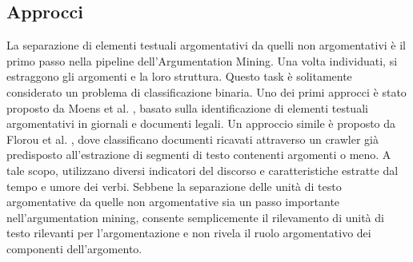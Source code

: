 \subsection{Approcci}
La separazione di elementi testuali argomentativi da quelli non argomentativi è il primo passo nella pipeline dell'Argumentation Mining. Una volta individuati, si estraggono gli argomenti e la loro struttura. Questo task è solitamente considerato un problema di classificazione binaria.
Uno dei primi approcci è stato proposto da  Moens et al. \cite{ashley2013}, basato sulla identificazione di elementi testuali argomentativi in giornali e documenti legali.
Un approccio simile è proposto da Florou et al. \cite{florou2013}, dove classificano documenti ricavati attraverso un crawler già predisposto all'estrazione di segmenti di testo contenenti argomenti o meno. A tale scopo, utilizzano diversi indicatori del discorso e caratteristiche estratte dal tempo e umore dei verbi. Sebbene la separazione delle unità di testo argomentative da quelle non argomentative sia un passo importante nell'argumentation mining, consente semplicemente il rilevamento di unità di testo rilevanti per l'argomentazione e non rivela il ruolo argomentativo dei componenti dell'argomento.

